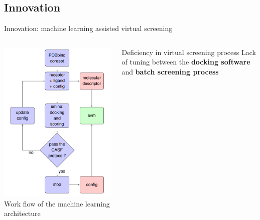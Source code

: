 \subsection{Innovation}
\begin{frame}{Innovation: machine learning assisted virtual screening}
    \begin{columns}
    \begin{column}{0.4\textwidth}
  \includegraphics[height = 0.8\textheight]{../figures/innovation.png}\\
 {\scriptsize Work flow of the machine learning architecture}
    \end{column}   
    \begin{column}{0.55\textwidth}
    \begin{block}{Deficiency in virtual screening process}
    Lack of tuning between the \textbf{docking software} and \textbf{batch screening process}

\end{block}
\end{column}
\end{columns}
\end{frame}
